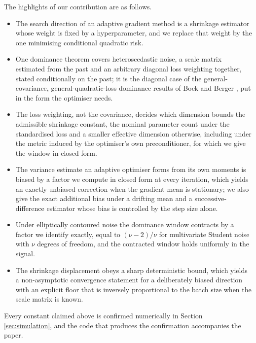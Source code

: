 \documentclass[pdflatex,sn-mathphys-num]{sn-jnl}%
\theoremstyle{thmstyleone}%
\theoremstyle{thmstyletwo}%
\theoremstyle{thmstylethree}%
\newcommand{\rev}[1]{#1}
\begin{document}
The highlights of our contribution are as follows. 
\begin{itemize}

\item The search direction of an adaptive gradient method is a shrinkage estimator whose weight is fixed by a hyperparameter, and we replace that weight by the one minimising conditional quadratic risk.

\item One dominance theorem covers heteroscedastic noise, a scale matrix estimated from the past and an arbitrary diagonal loss weighting together\rev{, stated conditionally on the past; it is the diagonal case of the general-covariance, general-quadratic-loss dominance results of Bock \cite{bock1975} and Berger \cite{berger1976jmva}, put in the form the optimiser needs.}

\item The loss weighting, not the covariance, decides which dimension bounds the admissible shrinkage constant, the nominal parameter count under the standardised loss and a smaller effective dimension otherwise\rev{, including under the metric induced by the optimiser's own preconditioner, for which we give the window in closed form.}

\item The variance estimate an adaptive optimiser forms from its own moments is biased by a factor we compute in closed form at every iteration, which yields an exactly unbiased correction\rev{ when the gradient mean is stationary; we also give the exact additional bias under a drifting mean and a successive-difference estimator whose bias is controlled by the step size alone.}

\item Under elliptically contoured noise the dominance window contracts by a factor we identify exactly, equal to $(\nu-2)/\nu$ for multivariate Student noise with $\nu$ degrees of freedom\rev{, and the contracted window holds uniformly in the signal.}

\item The shrinkage displacement obeys a sharp deterministic bound, which yields a non-asymptotic convergence statement for a deliberately biased direction with an explicit floor that is inversely proportional to the batch size\rev{ when the scale matrix is known.}

\end{itemize}

Every constant claimed above is confirmed numerically in Section \ref{sec:simulation}, and the code that produces the confirmation accompanies the paper.
\end{document}
